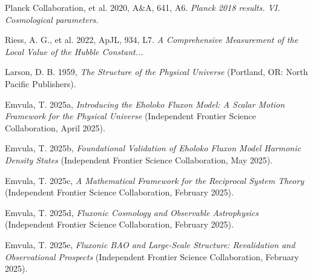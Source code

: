 \documentclass[11pt]{article}
\begin{document}
 
\begin{thebibliography}{99}
\raggedright
{}
Planck Collaboration, et al. 2020, A\&A, 641, A6.
\textit{Planck 2018 results. VI. Cosmological parameters.}

Riess, A. G., et al. 2022, ApJL, 934, L7.
\textit{A Comprehensive Measurement of the Local Value of the Hubble Constant...}

Larson, D. B. 1959, \textit{The Structure of the Physical Universe} (Portland, OR: North Pacific Publishers).

Emvula, T. 2025a, \textit{Introducing the Eholoko Fluxon Model: A Scalar Motion Framework for the Physical Universe} (Independent Frontier Science Collaboration, April 2025). 

Emvula, T. 2025b, \textit{Foundational Validation of Eholoko Fluxon Model Harmonic Density States} (Independent Frontier Science Collaboration, May 2025).

Emvula, T. 2025c, \textit{A Mathematical Framework for the Reciprocal System Theory} (Independent Frontier Science Collaboration, February 2025).

Emvula, T. 2025d, \textit{Fluxonic Cosmology and Observable Astrophysics} (Independent Frontier Science Collaboration, February 2025).

Emvula, T. 2025e, \textit{Fluxonic BAO and Large-Scale Structure: Revalidation and Observational Prospects} (Independent Frontier Science Collaboration, February 2025).

\end{thebibliography}
\end{document}
